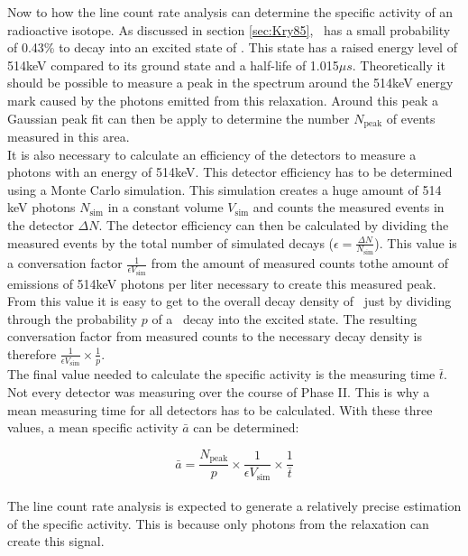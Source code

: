 \documentclass[encoding=utf8,british]{tumphthesis}
\begin{document}
Now to how the line count rate analysis can determine the specific activity of an radioactive isotope.
As discussed in section \ref{sec:Kry85}, \Kr\ has a small probability of 0.43\% to decay into an excited state of . 
This state has a raised energy level of 514keV compared to its ground state and a half-life of 1.015\(\unit{\mu s}\). 
Theoretically it should be possible to measure a peak in the spectrum around the 514keV energy mark caused by the photons emitted from this relaxation.
Around this peak a Gaussian peak fit can then be apply to determine the number $N_{\mathrm{peak}}$ of events measured in this area. 
\\

It is also necessary to calculate an efficiency of the detectors to measure a photons with an energy of 514keV.
This detector efficiency has to be determined using a Monte Carlo simulation.
This simulation creates a huge amount of 514 keV photons $N_{\mathrm{sim}}$  in a constant volume $V_{\mathrm{sim}}$ and counts the measured events in the detector $\Delta N$. 
The detector efficiency can then be calculated by dividing the measured events by the total number of simulated decays ($\epsilon = \frac{\Delta N}{N_{\mathrm{sim}}}$).
This value is a conversation factor $\frac{1}{\epsilon V_{\mathrm{sim}}}$ from the amount of measured counts tothe amount of emissions of 514keV photons per liter necessary to create this measured peak.
From this value it is easy to get to the overall decay density of \Kr\ just by dividing through the probability $p$ of a \Kr\ decay into the excited  state.
The resulting conversation factor from measured counts to the necessary decay density is therefore $\frac{1}{\epsilon V_{\mathrm{sim}}} \times \frac{1}{p}$.
\\

The final value needed to calculate the specific activity is the measuring time $\bar{t}$.
Not every detector was measuring over the course of Phase II.
This is why a mean measuring time for all detectors has to be calculated.
With these three values, a mean specific activity $\bar{a}$ can be determined:

\begin{equation}
    \bar{a} = \frac{N_{\mathrm{peak}}}{p}\times\frac{1}{\epsilon V_{\mathrm{sim}}}\times\frac{1}{\bar{t}}
    \label{equ:activityDieErste}
\end{equation}\\

The line count rate analysis is expected to generate a relatively precise estimation of the specific activity.
This is because only photons from the  relaxation can create this signal.
\\
\end{document}

